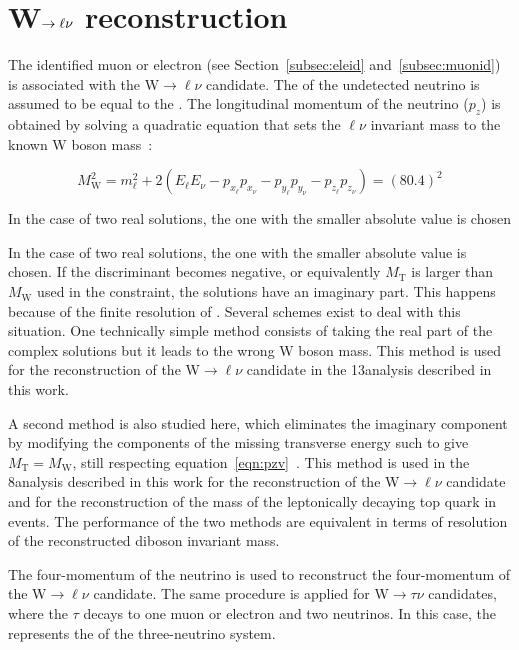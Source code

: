\section{W$\rightarrow\ell\nu$ reconstruction}\label{sec:leptonicW}

The identified muon or electron (see Section~\ref{subsec:eleid} and~\ref{subsec:muonid}) is associated with the W$\rightarrow\ell\nu$ candidate. 
The \pt of the undetected neutrino is assumed to be equal to the \ETmiss. The longitudinal momentum of the neutrino ($p_z$) is obtained by solving a quadratic equation that sets the $\ell\nu$ invariant
mass to the known W boson mass~\cite{Agashe:2014kda}:

\begin{equation}\label{eqn:pzv}
M_\mathrm{W}^2 = m_\ell^2   + 2(E_\ell E_\nu - p_{x_\ell}p_{x_\nu} - p_{y_\ell}p_{y_\nu} - p_{z_\ell}p_{z_\nu} ) = (80.4)^2
\end{equation}

In the case of two real solutions, the one with the smaller absolute value is chosen

In the case of two real solutions, the one with the smaller absolute value is chosen. 
If the discriminant becomes negative, or equivalently $M_\mathrm{T}$ is larger than $M_\mathrm{W}$ used in the constraint, the solutions have an imaginary part. This happens because of the finite resolution of \ETmiss.
Several schemes exist to deal with this situation. One technically simple method consists of taking the real part of the complex solutions but it leads to the wrong W boson mass. This method is used for the reconstruction of the W$\rightarrow\ell\nu$ candidate in the 13\TeV analysis described in this work.

A second method is also studied here, which eliminates the imaginary component by modifying the components of the missing transverse energy such to give $M_\mathrm{T} =  M_\mathrm{W}$, still respecting equation~\ref{eqn:pzv}~\cite{BauerPhd10}. This method is used in the 8\TeV analysis described in this work for the reconstruction of the W$\rightarrow\ell\nu$ candidate and for the reconstruction of the mass of the leptonically decaying top quark in \ttbar events. The performance of the two methods are equivalent in terms of resolution of the reconstructed diboson invariant mass.

The four-momentum of the neutrino is used to reconstruct the four-momentum of the W$\rightarrow\ell\nu$ candidate.
The same procedure is applied for W$\rightarrow\tau\nu$ candidates, where the $\tau$ decays to one muon or electron and two neutrinos.
In this case, the \Etmiss represents the \pt of the three-neutrino system.